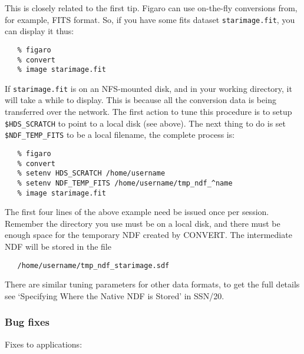 \begin{enumerate}
      This is closely related to the first tip.  Figaro can use
      on-the-fly conversions from, for example, FITS format.
      So, if you have some fits dataset \verb+starimage.fit+, you can
      display it thus:

\begin{verbatim}
   % figaro
   % convert
   % image starimage.fit
\end{verbatim}

      If \verb+starimage.fit+ is on an NFS-mounted disk, and in your
      working
      directory, it will take a while to display.  This is because all
      the conversion data is being transferred over the network.
      The first action to tune this procedure is to setup
      \verb+$HDS_SCRATCH+
      to point to a local disk (see above).  The next thing to do is
      set \verb+$NDF_TEMP_FITS+ to be a local filename,
      the complete process is:

\begin{verbatim}
   % figaro
   % convert
   % setenv HDS_SCRATCH /home/username
   % setenv NDF_TEMP_FITS /home/username/tmp_ndf_^name
   % image starimage.fit
\end{verbatim}

      The first four lines of the above example need be issued once per
      session.
      Remember the directory you use must be on a local disk, and there
      must be enough space for the temporary NDF created by CONVERT.
      The intermediate NDF will be stored in the file

\begin{verbatim}
   /home/username/tmp_ndf_starimage.sdf
\end{verbatim}

      There are similar tuning parameters for other data formats, to
      get the full details see `Specifying Where the Native NDF is
      Stored' in SSN/20.

\end{enumerate}

\subsubsection{Bug fixes}

   Fixes to applications:

